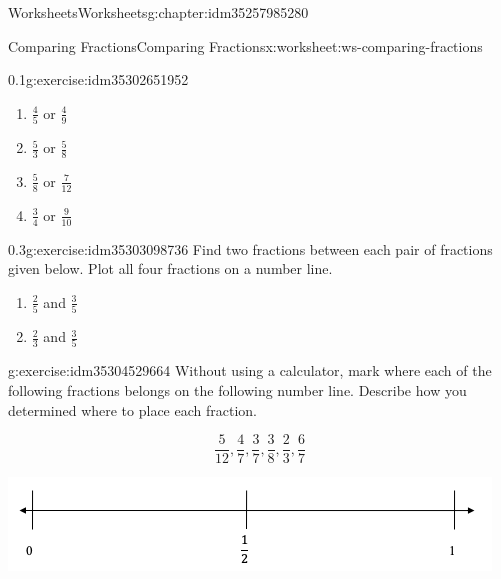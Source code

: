 \documentclass[twoside,11pt,]{book}
\begin{document}
\begin{chapterptx}{Worksheets}{}{Worksheets}{}{}{g:chapter:idm35257985280}
\begin{worksheet-section-numberless}{Comparing Fractions}{}{Comparing Fractions}{}{}{x:worksheet:ws-comparing-fractions}
\begin{divisionexercise}{3}{}{0.1}{g:exercise:idm35302651952}
%
\begin{enumerate}[label=(\alph*)]
\item{}\(\frac{4}{5} \) or \(\frac{4}{9} \)%
\item{}\(\frac{5}{3} \) or \(\frac{5}{8} \)%
\item{}\(\frac{5}{8} \) or \(\frac{7}{12} \)%
\item{}\(\frac{3}{4} \) or \(\frac{9}{10} \)%
\end{enumerate}
\end{divisionexercise}%
\clearpage
\begin{divisionexercise}{4}{}{0.3}{g:exercise:idm35303098736}%
Find two fractions between each pair of fractions given below. Plot all four fractions on a number line.%
%
\begin{enumerate}[label=(\alph*)]
\item{}\(\frac{2}{5} \) and \(\frac{3}{5} \)%
\item{}\(\frac{2}{3} \) and \(\frac{3}{5} \)%
\end{enumerate}
\end{divisionexercise}%
\begin{divisionexercise}{5}{}{}{g:exercise:idm35304529664}%
Without using a calculator, mark where each of the following fractions belongs on the following number line. Describe how you determined where to place each fraction.%
\par
%
\begin{equation*}
\frac{5}{12} , \frac{4}{7} , \frac{3}{7} , \frac{3}{8} , \frac{2}{3} , \frac{6}{7} 
\end{equation*}
%
\begin{sidebyside}{1}{0.05}{0.05}{0}%
\begin{sbspanel}{0.9}%
\includegraphics[width=1\linewidth]{images/number-line-half-one.png}
\end{sbspanel}%
\end{sidebyside}%
\end{divisionexercise}%
\end{worksheet-section-numberless}
\restoregeometry
%
%
\typeout{************************************************}
\typeout{************************************************}
%

\end{chapterptx}
\end{document}

